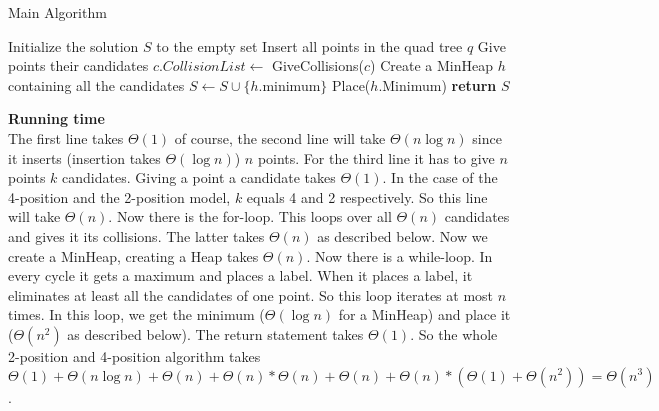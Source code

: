 \documentclass[crop=false,a4paper,oneside,11pt]{article}
\begin{document}
\begin{algorithm}[H]
\caption{Main Algorithm}
\begin{algorithmic}[1]
\State Initialize the solution $S$ to the empty set
\State Insert all points in the quad tree $q$
\State Give points their candidates
\State $c.CollisionList\gets$ GiveCollisions($c$)
\EndFor
\State Create a MinHeap $h$ containing all the candidates
\State $S\gets S\cup \{h.$minimum$\}$
\State Place($h$.Minimum)
\EndWhile
\State \textbf{return} $S$
\EndProcedure
\end{algorithmic}
\end{algorithm}
\textbf{Running time}\\
The first line takes $\Theta(1)$ of course, the second line will take $\Theta(n\log n)$ since it inserts (insertion takes $\Theta(\log n)$) $n$ points. For the third line it has to give $n$ points $k$ candidates. Giving a point a candidate takes $\Theta(1)$. In the case of the 4-position and the 2-position model, $k$ equals 4 and 2 respectively. So this line will take $\Theta(n)$. Now there is the for-loop. This loops over all $\Theta(n)$ candidates and gives it its collisions. The latter takes $\Theta(n)$ as described below. Now we create a MinHeap, creating a Heap takes $\Theta(n)$. Now there is a while-loop. In every cycle it gets a maximum and places a label. When it places a label, it eliminates at least all the candidates of one point. So this loop iterates at most $n$ times. In this loop, we get the minimum ($\Theta(\log n)$ for a MinHeap) and place it ($\Theta(n^2)$ as described below). The return statement takes $\Theta(1)$. So the whole 2-position and 4-position algorithm takes $\Theta(1)+\Theta(n\log n)+\Theta(n)+\Theta(n)*\Theta(n)+\Theta(n)+\Theta(n)*(\Theta(1)+\Theta(n^2))=\Theta(n^3)$. 
\end{document}
